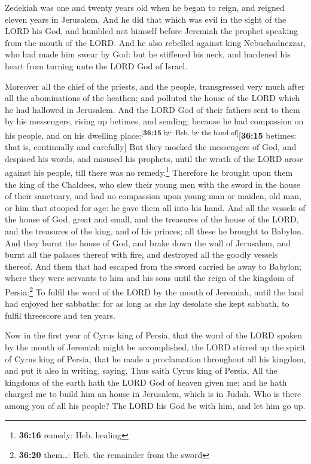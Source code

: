  Zedekiah was one and twenty years old when he began to
reign, and reigned eleven years in Jerusalem.  And he did
that which was evil in the sight of the LORD his God, and humbled not
himself before Jeremiah the prophet speaking from the mouth of the LORD.
 And he also rebelled against king Nebuchadnezzar, who
had made him swear by God: but he stiffened his neck, and hardened his
heart from turning unto the LORD God of Israel.

 Moreover all the chief of the priests, and the people,
transgressed very much after all the abominations of the heathen; and
polluted the house of the LORD which he had hallowed in Jerusalem.
 And the LORD God of their fathers sent to them by his
messengers, rising up betimes, and sending; because he had compassion on
his people, and on his dwelling place:\textsuperscript{{[}\textbf{36:15}
by: Heb. by the hand of{]}}{[}\textbf{36:15} betimes: that is,
continually and carefully{]}  But they mocked the
messengers of God, and despised his words, and misused his prophets,
until the wrath of the LORD arose against his people, till there was no
remedy.\footnote{\textbf{36:16} remedy: Heb. healing} 
Therefore he brought upon them the king of the Chaldees, who slew their
young men with the sword in the house of their sanctuary, and had no
compassion upon young man or maiden, old man, or him that stooped for
age: he gave them all into his hand.  And all the vessels
of the house of God, great and small, and the treasures of the house of
the LORD, and the treasures of the king, and of his princes; all these
he brought to Babylon.  And they burnt the house of God,
and brake down the wall of Jerusalem, and burnt all the palaces thereof
with fire, and destroyed all the goodly vessels thereof. 
And them that had escaped from the sword carried he away to Babylon;
where they were servants to him and his sons until the reign of the
kingdom of Persia:\footnote{\textbf{36:20} them\ldots: Heb. the
  remainder from the sword}  To fulfil the word of the
LORD by the mouth of Jeremiah, until the land had enjoyed her sabbaths:
for as long as she lay desolate she kept sabbath, to fulfil threescore
and ten years.

 Now in the first year of Cyrus king of Persia, that the
word of the LORD spoken by the mouth of Jeremiah might be accomplished,
the LORD stirred up the spirit of Cyrus king of Persia, that he made a
proclamation throughout all his kingdom, and put it also in writing,
saying,  Thus saith Cyrus king of Persia, All the
kingdoms of the earth hath the LORD God of heaven given me; and he hath
charged me to build him an house in Jerusalem, which is in Judah. Who is
there among you of all his people? The LORD his God be with him, and let
him go up.
